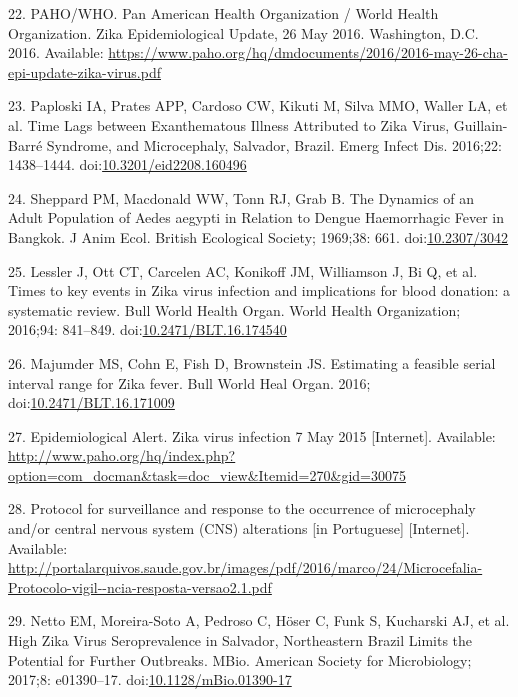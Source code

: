 \documentclass[10pt,letterpaper]{article}
\begin{document}
\hypertarget{ref-PahoPernambuco}{}
22. PAHO/WHO. Pan American Health Organization / World Health
Organization. Zika Epidemiological Update, 26 May 2016. Washington, D.C.
2016. Available:
\url{https://www.paho.org/hq/dmdocuments/2016/2016-may-26-cha-epi-update-zika-virus.pdf}

\hypertarget{ref-Paploski}{}
23. Paploski IA, Prates APP, Cardoso CW, Kikuti M, Silva MMO, Waller LA,
et al. Time Lags between Exanthematous Illness Attributed to Zika Virus,
Guillain-Barré Syndrome, and Microcephaly, Salvador, Brazil. Emerg
Infect Dis. 2016;22: 1438--1444.
doi:\href{https://doi.org/10.3201/eid2208.160496}{10.3201/eid2208.160496}

\hypertarget{ref-Sheppard1969}{}
24. Sheppard PM, Macdonald WW, Tonn RJ, Grab B. The Dynamics of an Adult
Population of Aedes aegypti in Relation to Dengue Haemorrhagic Fever in
Bangkok. J Anim Ecol. British Ecological Society; 1969;38: 661.
doi:\href{https://doi.org/10.2307/3042}{10.2307/3042}

\hypertarget{ref-Lessler2016}{}
25. Lessler J, Ott CT, Carcelen AC, Konikoff JM, Williamson J, Bi Q, et
al. Times to key events in Zika virus infection and implications for
blood donation: a systematic review. Bull World Health Organ. World
Health Organization; 2016;94: 841--849.
doi:\href{https://doi.org/10.2471/BLT.16.174540}{10.2471/BLT.16.174540}

\hypertarget{ref-Majumder2016a}{}
26. Majumder MS, Cohn E, Fish D, Brownstein JS. Estimating a feasible
serial interval range for Zika fever. Bull World Heal Organ. 2016;
doi:\href{https://doi.org/10.2471/BLT.16.171009}{10.2471/BLT.16.171009}

\hypertarget{ref-ReportingChange}{}
27. Epidemiological Alert. Zika virus infection 7 May 2015
{[}Internet{]}. Available:
\url{http://www.paho.org/hq/index.php?option=com_docman\&task=doc_view\&Itemid=270\&gid=30075}

\hypertarget{ref-ProtocolCZS}{}
28. Protocol for surveillance and response to the occurrence of
microcephaly and/or central nervous system (CNS) alterations {[}in
Portuguese{]} {[}Internet{]}. Available:
\url{http://portalarquivos.saude.gov.br/images/pdf/2016/marco/24/Microcefalia-Protocolo-vigil--ncia-resposta-versao2.1.pdf}

\hypertarget{ref-Netto}{}
29. Netto EM, Moreira-Soto A, Pedroso C, Höser C, Funk S, Kucharski AJ,
et al. High Zika Virus Seroprevalence in Salvador, Northeastern Brazil
Limits the Potential for Further Outbreaks. MBio. American Society for
Microbiology; 2017;8: e01390--17.
doi:\href{https://doi.org/10.1128/mBio.01390-17}{10.1128/mBio.01390-17}

\nolinenumbers
\end{document}
